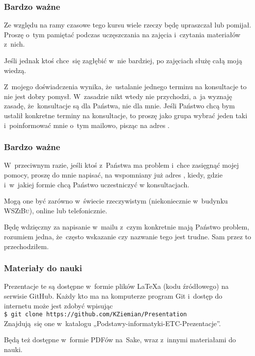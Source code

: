 \documentclass[10pt,t]{beamer}
\begin{document}
\begin{frame}
  \frametitle{Bardzo ważne}


  Ze względu na ramy czasowe tego kursu wiele rzeczy będę
  \alert{upraszczał} lub \alert{pomijał}. Proszę o~tym pamiętać podczas
  uczęszczania na zajęcia i~czytania materiałów z~nich.

  Jeśli jednak ktoś chce~się zagłębić w~nie bardziej, po zajęciach służę
  całą moją wiedzą.

  Z~mojego doświadczenia wynika, że~ustalanie jednego terminu na konsultacje
  to nie jest dobry pomysł. W~zasadzie nikt wtedy nie przychodzi, a~ja
  wyznaję zasadę, że~konsultacje są dla Państwa, nie dla mnie. Jeśli
  Państwo chcą bym ustalił konkretne terminy na konsultacje, to proszę jako
  grupa wybrać jeden taki i~poinformować mnie o~tym mailowo, pisząc na
  adres \email.

\end{frame}





\begin{frame}
  \frametitle{Bardzo ważne}


  W~przeciwnym razie, jeśli ktoś z~Państwa ma problem i~chce zasięgnąć
  mojej pomocy, proszę do mnie napisać, na wspomniany już adres \email,
  kiedy, gdzie i~w~jakiej formie chcą Państwo uczestniczyć w konsultacjach.

  Mogą one być zarówno w~świecie rzeczywistym (niekoniecznie w~budynku
  \textsc{WSZiBu}), online lub telefonicznie.

  Będę wdzięczny za napisanie w~mailu z~czym konkretnie mają Państwo
  problem, rozumiem jedna, że~często wskazanie czy nazwanie tego jest
  trudne. Sam przez to przechodziłem.

\end{frame}





\begin{frame}
  \frametitle{Materiały do nauki}


  Prezentacje te są dostępne w~formie plików \LaTeX a (kodu źródłowego)
  na serwisie GitHub. Każdy kto ma na komputerze program Git i~dostęp
  do internetu może jest zdobyć wpisując \\
  \texttt{\$ git clone https://github.com/KZiemian/Presentation} \\
  Znajdują~się one w~katalogu „Podstawy-informatyki-ETC-Prezentacje”.

  Będą też dostępne w~formie PDFów na~Sake, wraz z~innymi materiałami
  do nauki.

\end{frame}
\end{document}
